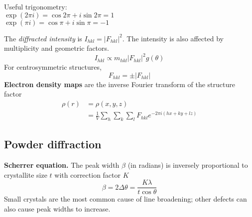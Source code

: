 Useful trigonometry: \\
$\exp{(2 \pi i)} = \cos 2\pi + i \sin 2\pi = 1$ \\
$\exp{(\pi i)} = \cos \pi + i \sin \pi = -1$
\vspace{\baselineskip}

The \textit{diffracted intensity} is $I_{hkl} = |F_{hkl}|^2$. The intensity is also affected by multiplicity and geometric factors.
\begin{equation*}
  I_{hkl} \propto m_{hkl} |F_{hkl}|^2 g(\theta)
\end{equation*}
For centrosymmetric structures,
\begin{equation*}
  F_{hkl} = \pm |F_{hkl}|
\end{equation*}
\textbf{Electron density maps} are the inverse Fourier transform of the structure factor
\begin{equation*}
  \begin{aligned}
    \rho(r) &= \rho(x,y,z) \\
    &= \frac{1}{V} \sum_h \sum_k \sum_l F_{hkl} e^{-2 \pi i \left( hx + ky + lz\right)}
  \end{aligned}
\end{equation*}

\subsection*{Powder diffraction}

\textbf{Scherrer equation.} The peak width $\beta$ (in radians) is inversely proportional to crystallite size $t$ with correction factor $K$
\begin{equation*}
  \beta = 2 \Delta \theta = \frac{K \lambda}{t \cos \theta}
\end{equation*}
Small crystals are the most common cause of line broadening; other defects can also cause peak widths to increase.

